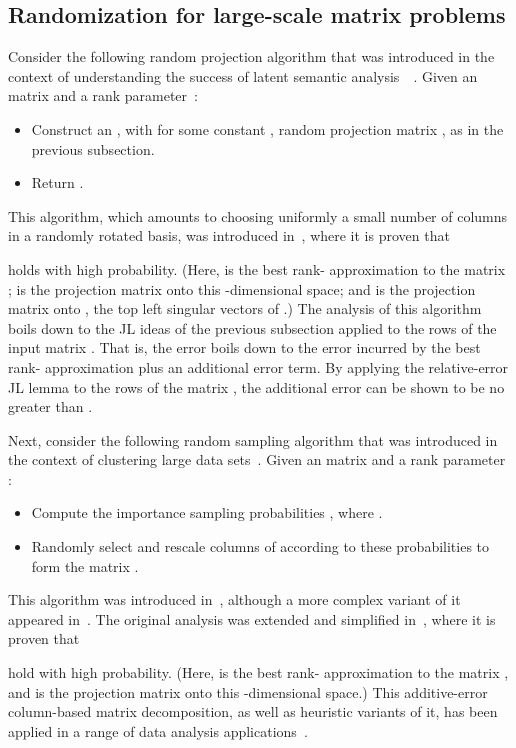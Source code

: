\documentclass[twoside]{article}
\begin{document}
\subsection{Randomization for large-scale matrix problems}
\label{sxn:background2:previous}

Consider the following random projection algorithm that was introduced in 
the context of understanding the success of latent semantic 
analysis~~\cite{PRTV00}.
Given an  matrix  and a rank parameter~:
\begin{itemize}
\item
Construct an , with  for 
some constant , random projection matrix , as in the previous 
subsection.
\item
Return .
\end{itemize}
This algorithm, which amounts to choosing uniformly a small number  
of columns in a randomly rotated basis, was introduced in~\cite{PRTV00}, 
where it is proven that

holds with high probability.
(Here,  is the best rank- approximation to the matrix ; 
 is the projection matrix onto this -dimensional space; and
 is the projection matrix onto , the top  left singular 
vectors of .)
The analysis of this algorithm boils down to the JL ideas of the previous 
subsection applied to the rows of the input matrix .
That is, the error  boils down to the error incurred by
the best rank- approximation plus an additional error term.
By applying the relative-error JL lemma to the rows of the matrix , the 
additional error can be shown to be no greater than .

Next, consider the following random sampling algorithm that was 
introduced in the context of clustering large data sets~\cite{DFKVV04_JRNL}.
Given an  matrix  and a rank parameter :
\begin{itemize}
\item
Compute the importance sampling probabilities , where 
.
\item
Randomly select and rescale  columns of 
according to these probabilities to form the matrix .
\end{itemize}
This algorithm was introduced in~\cite{DFKVV04_JRNL}, although a more 
complex variant of it appeared in~\cite{FKV04}.
The original analysis was extended and simplified in~\cite{dkm_matrix2}, 
where it is proven that

hold with high probability.
(Here,  is the best rank- approximation to the matrix , and 
 is the projection matrix onto this -dimensional space.)
This additive-error column-based matrix decomposition, as well as heuristic 
variants of it, has been applied in a range of data analysis 
applications~\cite{MMD06,Paschou07a,SXZF07_cmdmatrix,TPSYF08,PZW08}. 
\end{document}
